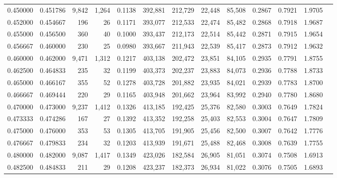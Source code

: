 \begin{tabular}{rrrrrrrrrrrrr}
0.450000 & 0.451786 &  9,842 & 1,264 &                                     0.1138 & 392,881 & 212,729 &  22,448 &  85,508 & 0.2867 & 0.7921 & 1.9705 \\
0.452000 & 0.454667 &    196 &    26 &                                     0.1171 & 393,077 & 212,533 &  22,474 &  85,482 & 0.2868 & 0.7918 & 1.9687 \\
0.455000 & 0.456500 &    360 &    40 &                                     0.1000 & 393,437 & 212,173 &  22,514 &  85,442 & 0.2871 & 0.7915 & 1.9654 \\
0.456667 & 0.460000 &    230 &    25 &                                     0.0980 & 393,667 & 211,943 &  22,539 &  85,417 & 0.2873 & 0.7912 & 1.9632 \\
0.460000 & 0.462000 &  9,471 & 1,312 &                                     0.1217 & 403,138 & 202,472 &  23,851 &  84,105 & 0.2935 & 0.7791 & 1.8755 \\
0.462500 & 0.464833 &    235 &    32 &                                     0.1199 & 403,373 & 202,237 &  23,883 &  84,073 & 0.2936 & 0.7788 & 1.8733 \\
0.465000 & 0.466167 &    355 &    52 &                                     0.1278 & 403,728 & 201,882 &  23,935 &  84,021 & 0.2939 & 0.7783 & 1.8700 \\
0.466667 & 0.469444 &    220 &    29 &                                     0.1165 & 403,948 & 201,662 &  23,964 &  83,992 & 0.2940 & 0.7780 & 1.8680 \\
0.470000 & 0.473000 &  9,237 & 1,412 &                                     0.1326 & 413,185 & 192,425 &  25,376 &  82,580 & 0.3003 & 0.7649 & 1.7824 \\
0.473333 & 0.474286 &    167 &    27 &                                     0.1392 & 413,352 & 192,258 &  25,403 &  82,553 & 0.3004 & 0.7647 & 1.7809 \\
0.475000 & 0.476000 &    353 &    53 &                                     0.1305 & 413,705 & 191,905 &  25,456 &  82,500 & 0.3007 & 0.7642 & 1.7776 \\
0.476667 & 0.479833 &    234 &    32 &                                     0.1203 & 413,939 & 191,671 &  25,488 &  82,468 & 0.3008 & 0.7639 & 1.7755 \\
0.480000 & 0.482000 &  9,087 & 1,417 &                                     0.1349 & 423,026 & 182,584 &  26,905 &  81,051 & 0.3074 & 0.7508 & 1.6913 \\
0.482500 & 0.484833 &    211 &    29 &                                     0.1208 & 423,237 & 182,373 &  26,934 &  81,022 & 0.3076 & 0.7505 & 1.6893 \\

\end{tabular}
